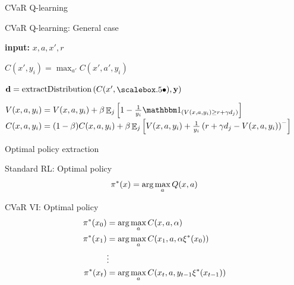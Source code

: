 \documentclass{beamer}
\begin{document}

\begin{frame}{CVaR Q-learning}

\begin{block}{CVaR Q-learning: General case}
\begin{algorithmic}[1]

    \STATE \textbf{input:} $x, a, x', r$
    
	\STATE $C(x', y_i) = \max_{a'} C(x', a', y_i)$
	\ENDFOR
	
	\STATE $\mathbf{d}= \text{extractDistribution}\bround{C(x', \bigcdot), \mathbf{y}}$

	\STATE $V(x, a, y_i) = V(x, a, y_i) + \beta \expect_j\bsquare{1 - \frac{1}{y_i}\indicator_{(V(x, a, y_i) \ge r+\gamma d_j)}}$
	\STATE $C(x, a, y_i) = (1-\beta)C(x, a, y_i) + \beta\mathop{\mathbb{E}}_j\left[ {V(x, a, y_i) + \frac{1}{y_i}\left( {r+\gamma d_j - V(x, a, y_i)} \right)^-} \right]$
	\ENDFOR
\end{algorithmic}
\end{block}
\end{frame}



\begin{frame}{Optimal policy extraction}

\begin{block}{Standard RL: Optimal policy}
$$\pi^*(x) = \text{arg}\max_a Q(x, a)$$
\end{block}

\begin{block}{CVaR VI: Optimal policy}
\begin{align*}
\pi^*(x_0) &= \text{arg}\max_a C(x, a, \alpha)\\
\pi^*(x_1) &= \text{arg}\max_a C(x_1, a, \alpha\xi^*(x_0))\\
&\vdots\\
\pi^*(x_t) &= \text{arg}\max_a C(x_t, a, y_{t-1}\xi^*(x_{t-1}))\\
\end{align*}
\end{block}

\end{frame}

\end{document}
